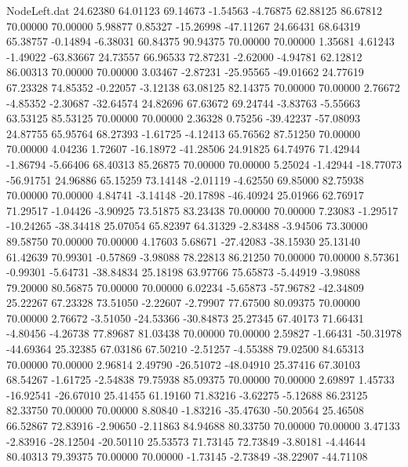 \begin{filecontents}{NodeLeft.dat}
  24.62380   64.01123   69.14673    -1.54563   -4.76875   62.88125   86.67812   70.00000   70.00000    5.98877    0.85327  -15.26998  -47.11267
  24.66431   68.64319   65.38757    -0.14894   -6.38031   60.84375   90.94375   70.00000   70.00000    1.35681    4.61243   -1.49022  -63.83667
  24.73557   66.96533   72.87231    -2.62000   -4.94781   62.12812   86.00313   70.00000   70.00000    3.03467   -2.87231  -25.95565  -49.01662
  24.77619   67.23328   74.85352    -0.22057   -3.12138   63.08125   82.14375   70.00000   70.00000    2.76672   -4.85352   -2.30687  -32.64574
  24.82696   67.63672   69.24744    -3.83763   -5.55663   63.53125   85.53125   70.00000   70.00000    2.36328    0.75256  -39.42237  -57.08093
  24.87755   65.95764   68.27393    -1.61725   -4.12413   65.76562   87.51250   70.00000   70.00000    4.04236    1.72607  -16.18972  -41.28506
  24.91825   64.74976   71.42944    -1.86794   -5.66406   68.40313   85.26875   70.00000   70.00000    5.25024   -1.42944  -18.77073  -56.91751
  24.96886   65.15259   73.14148    -2.01119   -4.62550   69.85000   82.75938   70.00000   70.00000    4.84741   -3.14148  -20.17898  -46.40924
  25.01966   62.76917   71.29517    -1.04426   -3.90925   73.51875   83.23438   70.00000   70.00000    7.23083   -1.29517  -10.24265  -38.34418
  25.07054   65.82397   64.31329    -2.83488   -3.94506   73.30000   89.58750   70.00000   70.00000    4.17603    5.68671  -27.42083  -38.15930
  25.13140   61.42639   70.99301    -0.57869   -3.98088   78.22813   86.21250   70.00000   70.00000    8.57361   -0.99301   -5.64731  -38.84834
  25.18198   63.97766   75.65873    -5.44919   -3.98088   79.20000   80.56875   70.00000   70.00000    6.02234   -5.65873  -57.96782  -42.34809
  25.22267   67.23328   73.51050    -2.22607   -2.79907   77.67500   80.09375   70.00000   70.00000    2.76672   -3.51050  -24.53366  -30.84873
  25.27345   67.40173   71.66431    -4.80456   -4.26738   77.89687   81.03438   70.00000   70.00000    2.59827   -1.66431  -50.31978  -44.69364
  25.32385   67.03186   67.50210    -2.51257   -4.55388   79.02500   84.65313   70.00000   70.00000    2.96814    2.49790  -26.51072  -48.04910
  25.37416   67.30103   68.54267    -1.61725   -2.54838   79.75938   85.09375   70.00000   70.00000    2.69897    1.45733  -16.92541  -26.67010
  25.41455   61.19160   71.83216    -3.62275   -5.12688   86.23125   82.33750   70.00000   70.00000    8.80840   -1.83216  -35.47630  -50.20564
  25.46508   66.52867   72.83916    -2.90650   -2.11863   84.94688   80.33750   70.00000   70.00000    3.47133   -2.83916  -28.12504  -20.50110
  25.53573   71.73145   72.73849    -3.80181   -4.44644   80.40313   79.39375   70.00000   70.00000   -1.73145   -2.73849  -38.22907  -44.71108

\end{filecontents}

